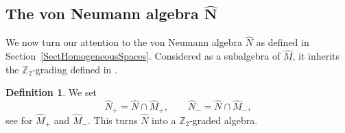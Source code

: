 \documentclass[pdftex]{sigma}
\numberwithin{equation}{section}
\theoremstyle{definition}
\newtheorem{dfn}[thm]{Definition}
\begin{document}
\subsection*{The von Neumann algebra $\boldsymbol{\hat{N}}$}
We now turn our attention to the von Neumann algebra $\hat{N}$ as def\/ined in Section~\ref{SectHomogeneousSpaces}. Considered as a subalgebra of $\hat{M}$, it inherits the  $\mathbb{Z}_2$-grading def\/ined in \cite[Def\/inition~4.7]{GroKoeKus}.

\begin{dfn}
We set
\[
\hat{N}_+ = \hat{N} \cap \hat{M}_+, \qquad \hat{N}_- = \hat{N} \cap \hat{M}_-,
\]
see \cite[Def\/inition 4.7]{GroKoeKus} for $\hat{M}_+$ and $\hat{M}_-$. This turns $\hat{N}$ into a $\mathbb{Z}_2$-graded algebra.
\end{dfn}
\end{document}
